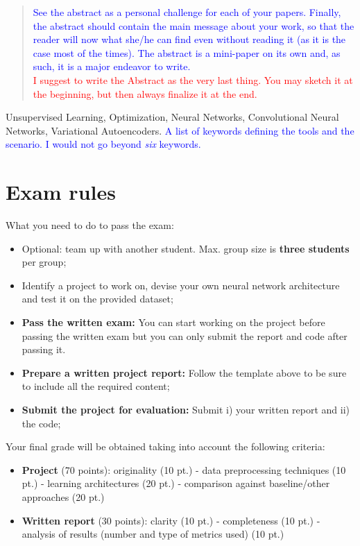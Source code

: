 \documentclass[10pt, conference, letterpaper]{IEEEtran}
\newcommand\MR[1]{\textcolor{blue}{#1}}
\newcommand\red[1]{\textcolor{red}{#1}}
\begin{document}
\begin{abstract}
\MR{See the abstract as a personal challenge for each of your papers. Finally, the abstract should contain the main message about your work, so that the reader will now what she/he can find even without reading it (as it is the case most of the times). The abstract is a mini-paper on its own and, as such, it is a major endeavor to write.}\\ 

\red{I suggest to write the Abstract as the very last thing. You may sketch it at the beginning, but then always finalize it at the end.}
\end{abstract}

\IEEEkeywords
Unsupervised Learning, Optimization, Neural Networks, Convolutional Neural Networks, Variational Autoencoders. \MR{A list of keywords defining the tools and the scenario. I would not go beyond {\it six} keywords.}
\endIEEEkeywords












\section{Exam rules}

What you need to do to pass the exam:
\begin{itemize}
\item Optional: team up with another student. Max. group size is \textbf{three students} per group;
\item Identify a project to work on, devise your own neural network architecture and test it on the provided dataset;
\item \textbf{Pass the written exam:} You can start working on the project before passing the written exam but you can only submit the report and code after passing it.
\item \textbf{Prepare a written project report:} Follow the template above to be sure to include all the required content;
\item \textbf{Submit the project for evaluation:} Submit i) your written report and ii) the code;
\end{itemize}

Your final grade will be obtained taking into account the following criteria:
\begin{itemize} 
\item \textbf{Project} (70 points): originality (10 pt.) - data preprocessing techniques (10 pt.) - learning architectures (20 pt.) - comparison against baseline/other approaches (20 pt.) 
\item \textbf{Written report} (30 points): clarity (10 pt.) - completeness (10 pt.) - analysis of results (number and type of metrics used) (10 pt.)
\end{itemize}
\end{document}
